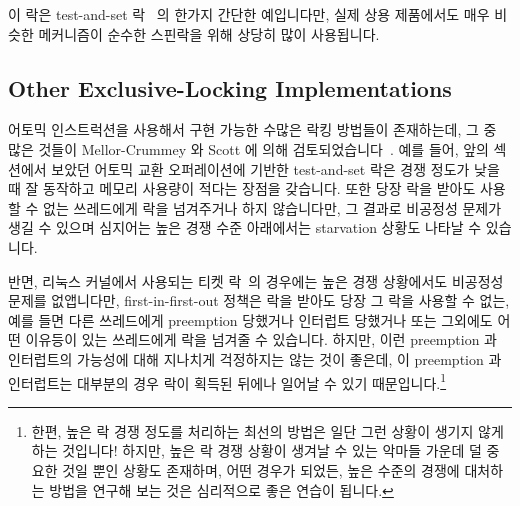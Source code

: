 이 락은 test-and-set 락~\cite{Segall84} 의 한가지 간단한 예입니다만, 실제 상용
제품에서도 매우 비슷한 메커니즘이 순수한 스핀락을 위해 상당히 많이 사용됩니다.

\subsection{Other Exclusive-Locking Implementations}
\label{sec:locking:Other Exclusive-Locking Implementations}

어토믹 인스트럭션을 사용해서 구현 가능한 수많은 락킹 방법들이 존재하는데, 그 중
많은 것들이 Mellor-Crummey 와 Scott 에 의해
검토되었습니다~\cite{MellorCrummey91a}.
예를 들어, 앞의 섹션에서 보았던 어토믹 교환 오퍼레이션에 기반한 test-and-set
락은 경쟁 정도가 낮을 때 잘 동작하고 메모리 사용량이 적다는 장점을 갖습니다.
또한 당장 락을 받아도 사용할 수 없는 쓰레드에게 락을 넘겨주거나 하지
않습니다만, 그 결과로 비공정성 문제가 생길 수 있으며 심지어는 높은 경쟁 수준
아래에서는 starvation 상황도 나타날 수 있습니다.

반면, 리눅스 커널에서 사용되는 티켓 락~\cite{MellorCrummey91a}의 경우에는 높은
경쟁 상황에서도 비공정성 문제를 없앱니다만, first-in-first-out 정책은 락을
받아도 당장 그 락을 사용할 수 없는, 예를 들면 다른 쓰레드에게 preemption
당했거나 인터럽트 당했거나 또는 그외에도 어떤 이유등이 있는 쓰레드에게 락을
넘겨줄 수 있습니다.
하지만, 이런 preemption 과 인터럽트의 가능성에 대해 지나치게 걱정하지는 않는
것이 좋은데, 이 preemption 과 인터럽트는 대부분의 경우 락이 획득된 뒤에나
일어날 수 있기 때문입니다.\footnote{
	한편, 높은 락 경쟁 정도를 처리하는 최선의 방법은 일단 그런 상황이
	생기지 않게 하는 것입니다!
	하지만, 높은 락 경쟁 상황이 생겨날 수 있는 악마들 가운데 덜 중요한 것일
	뿐인 상황도 존재하며, 어떤 경우가 되었든, 높은 수준의 경쟁에 대처하는
	방법을 연구해 보는 것은 심리적으로 좋은 연습이 됩니다.}
\iffalse

